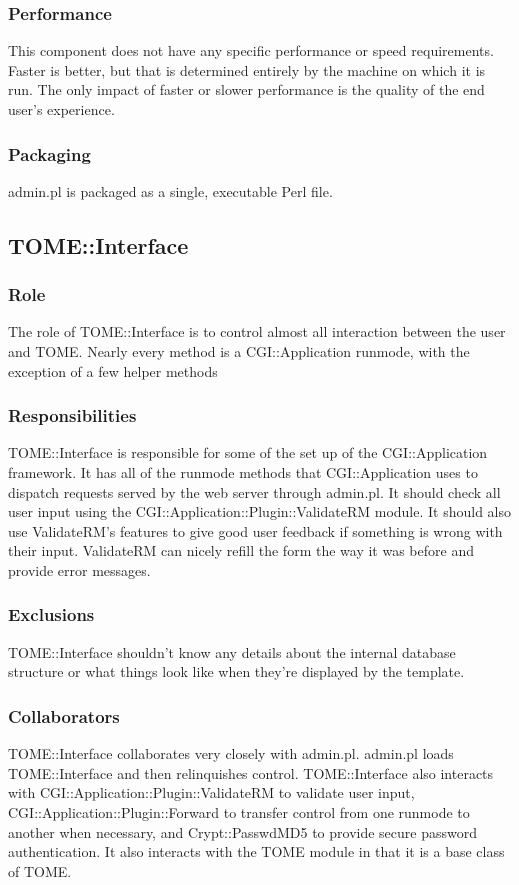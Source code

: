 \documentclass[12pt,titlepage]{article}
\begin{document}
\subsubsection{Performance}
This component does not have any specific performance or speed requirements.  Faster is better, but that is determined entirely by the machine on which it is run.  The only impact of faster or slower performance is the quality of the end user's experience.
\subsubsection{Packaging}
admin.pl is packaged as a single, executable Perl file.


\subsection{TOME::Interface}
\subsubsection{Role}
The role of TOME::Interface is to control almost all interaction between the user and TOME. Nearly every method is a CGI::Application runmode, with the exception of a few helper methods
\subsubsection{Responsibilities}
TOME::Interface is responsible for some of the set up of the CGI::Application framework.  It has all of the runmode methods that CGI::Application uses to dispatch requests served by the web server through admin.pl.  It should check all user input using the CGI::Application::Plugin::ValidateRM module.  It should also use ValidateRM's features to give good user feedback if something is wrong with their input. ValidateRM can nicely refill the form the way it was before and provide error messages.
\subsubsection{Exclusions}
TOME::Interface shouldn't know any details about the internal database structure or what things look like when they're displayed by the template.
\subsubsection{Collaborators}
TOME::Interface collaborates very closely with admin.pl.  admin.pl loads TOME::Interface and then relinquishes control.  TOME::Interface also interacts with CGI::Application::Plugin::ValidateRM to validate user input, CGI::Application::Plugin::Forward to transfer control from one runmode to another when necessary, and Crypt::PasswdMD5 to provide secure password authentication.  It also interacts with the TOME module in that it is a base class of TOME.
\end{document}
